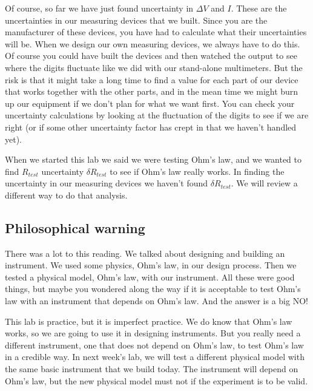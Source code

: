 Of course, so far we have just found uncertainty in $\Delta V$ and $I$.
These are the uncertainties in our measuring devices that we built. Since
you are the manufacturer of these devices, you have had to calculate what
their uncertainties will be. When we design our own measuring devices, we
always have to do this. Of course you could have built the devices and then
watched the output to see where the digits fluctuate like we did with our
stand-alone multimeters. But the risk is that it might take a long time to
find a value for each part of our device that works together with the other
parts, and in the mean time we might burn up our equipment if we don't plan
for what we want first. You can check your uncertainty calculations by
looking at the fluctuation of the digits to see if we are right (or if some
other uncertainty factor has crept in that we haven't handled yet).

When we started this lab we said we were testing Ohm's law, and we wanted to
find $R_{test}$ uncertainty $\delta R_{test}$ to see if Ohm's law really
works. In finding the uncertainty in our measuring devices we haven't found $%
\delta R_{test}.$ We will review a different way to do that analysis.

%


\subsection{Philosophical warning}

There was a lot to this reading. We talked about designing and building an
instrument. We used some physics, Ohm's law, in our design process. Then we
tested a physical model, Ohm's law, with our instrument. All these were good
things, but maybe you wondered along the way if it is acceptable to test
Ohm's law with an instrument that depends on Ohm's law. And the answer is a
big NO!

This lab is practice, but it is imperfect practice. We do know that Ohm's
law works, so we are going to use it in designing instruments. But you
really need a different instrument, one that does not depend on Ohm's law,
to test Ohm's law in a credible way. In next week's lab, we will test a
different physical model with the same basic instrument that we build today.
The instrument will depend on Ohm's law, but the new physical model must not
if the experiment is to be valid.

